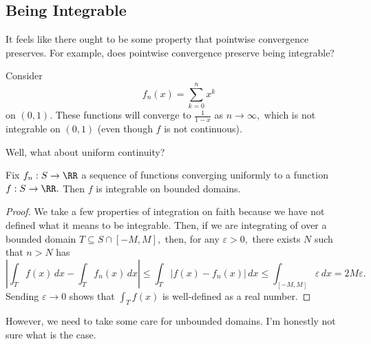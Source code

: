 \documentclass[../notes.tex]{subfiles}
\begin{document}
\subsection{Being Integrable}
It feels like there ought to be some property that pointwise convergence preserves. For example, does pointwise convergence preserve being integrable?
\begin{example}
	Consider
	\[f_n(x)=\sum_{k=0}^nx^k\]
	on $(0,1).$ These functions will converge to $\frac1{1-x}$ as $n\to\infty,$ which is not integrable on $(0,1)$ (even though $f$ is not continuous).
\end{example}
Well, what about uniform continuity?
\begin{proposition}
	Fix $f_n:S\to\RR$ a sequence of functions converging uniformly to a function $f:S\to\RR.$ Then $f$ is integrable on bounded domains.
\end{proposition}
\begin{proof}
	We take a few properties of integration on faith because we have not defined what it means to be integrable. Then, if we are integrating of over a bounded domain $T\subseteq S\cap[-M,M],$ then, for any $\varepsilon>0,$ there exists $N$ such that $n>N$ has
	\[\left|\int_Tf(x)\,dx-\int_Tf_n(x)\,dx\right|\le\int_T|f(x)-f_n(x)|\,dx\le\int_{[-M,M]}\varepsilon\,dx=2M\varepsilon.\]
	Sending $\varepsilon\to0$ shows that $\int_Tf(x)$ is well-defined as a real number.
\end{proof}
However, we need to take some care for unbounded domains. I'm honestly not sure what is the case.
\end{document}
